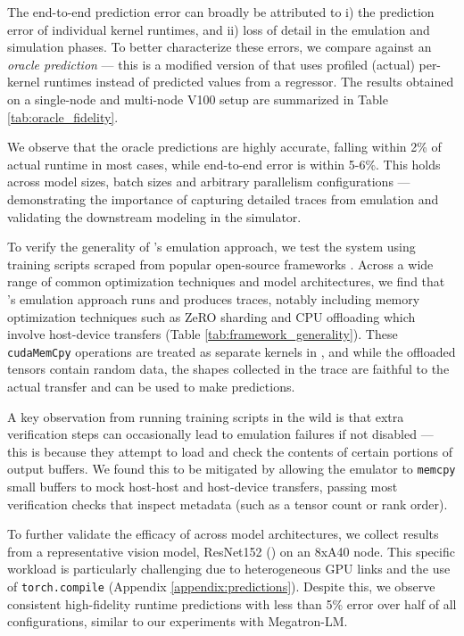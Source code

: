  The end-to-end prediction error can broadly be attributed to i) the prediction error of individual kernel runtimes, and ii) loss of detail in the emulation and simulation phases. To better characterize these errors, we compare against an \textit{oracle prediction} --- this is a modified version of \sysname that uses profiled (actual) per-kernel runtimes instead of predicted values from a regressor. The results obtained on a single-node and multi-node V100 setup are summarized in Table \ref{tab:oracle_fidelity}. 


We observe that the oracle predictions are highly accurate, falling within 2\% of actual runtime in most cases, while end-to-end error is within 5-6\%. This holds across model sizes, batch sizes and arbitrary parallelism configurations --- demonstrating the importance of capturing detailed traces from emulation and validating the downstream modeling in the simulator.

To verify the generality of \sysname's emulation approach, we test the system using training scripts scraped from popular open-source frameworks \cite{deepspeedvisiongithub, hfaccelerate}. Across a wide range of common optimization techniques and model architectures, we find that \sysname's emulation approach runs and produces traces, notably including memory optimization techniques such as ZeRO sharding and CPU offloading which involve host-device transfers (Table \ref{tab:framework_generality}). These \texttt{cudaMemCpy} operations are treated as separate kernels in \sysname, and while the offloaded tensors contain random data, the shapes collected in the trace are faithful to the actual transfer and can be used to make predictions.


A key observation from running training scripts in the wild is that extra verification steps can occasionally lead to emulation failures if not disabled --- this is because they attempt to load and check the contents of certain portions of output buffers. We found this to be mitigated by allowing the emulator to \texttt{memcpy} small buffers to mock host-host and host-device transfers, passing most verification checks that inspect metadata (such as a tensor count or rank order).

To further validate the efficacy of \sysname across model architectures, we collect results from a representative vision model, ResNet152 () on an 8xA40 node. This specific workload is particularly challenging due to heterogeneous GPU links and the use of \texttt{torch.compile} (Appendix \ref{appendix:predictions}). Despite this, we observe consistent high-fidelity runtime predictions with less than 5\% error over half of all configurations, similar to our experiments with Megatron-LM.

